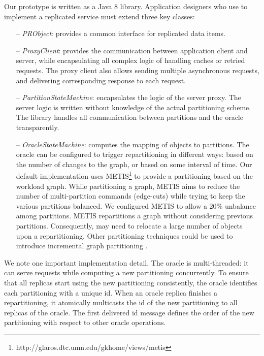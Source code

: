 Our  \dynastar prototype is written as a
Java 8 library.
Application designers who use \dynastar
 to implement a replicated service must extend three key classes:
 \begin{itemize}
 \item[--] \emph{PRObject}: provides a common interface for replicated data items.
 \item[--] \emph{ProxyClient}: provides the communication between application client and server, while encapsulating all 
 complex logic of handling caches or retried requests. The proxy client also allows sending multiple asynchronous requests, and delivering corresponding response to each request.
 \item[--] \emph{PartitionStateMachine}: encapsulates the logic of the server
   proxy. The server logic is written without knowledge of the actual partitioning scheme. The \dynastar library
   handles all communication between partitions and the oracle transparently.
 \item[--] \emph{OracleStateMachine}: computes the mapping of objects to partitions.
The oracle can be configured to trigger repartitioning in different ways: based on the number of changes to the graph, or based on some interval of time.
Our default implementation uses METIS\footnote{http://glaros.dtc.umn.edu/gkhome/views/metis} to provide a partitioning based on the workload graph.
While partitioning a graph, METIS aims to reduce the number of multi-partition commands (edge-cuts) while trying to keep the various partitions balanced. 
We configured METIS to allow a 20\% unbalance among partitions. 
METIS repartitions a graph without considering previous partitions.
Consequently, \dynastar may need to relocate a large number of objects upon a repartitioning.
Other partitioning techniques could be used to introduce incremental graph partitioning \cite{SerafiniTEPAS16}.
%
 \end{itemize}

 We note one important implementation detail.  The oracle is
 multi-threaded: it can serve requests while computing a new
 partitioning concurrently. To ensure that all replicas start using
 the new partitioning consistently, the oracle identifies each
 partitioning with a unique id.  When an oracle replica finishes a
 repartitioning, it atomically multicasts the id of the new
 partitioning to all replicas of the oracle.  The first delivered id
 message defines the order of the new partitioning with respect to
 other oracle operations.

